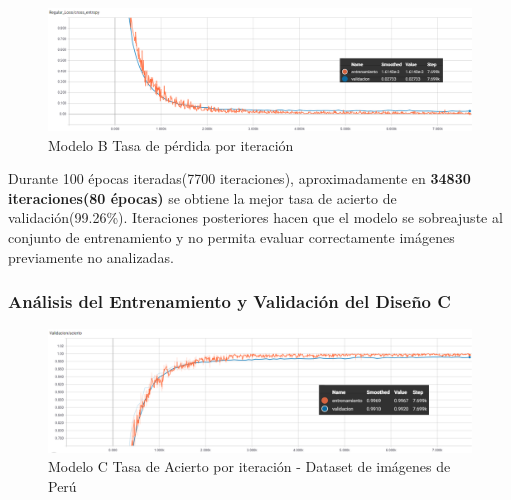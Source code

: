			
			\begin{figure}[H]
				\begin{center}
				\includegraphics[width=1\textwidth]{images/desarrollo/trainResults/peru/model1Loss} 
				\end{center}
				\begin{center}
				\caption{\small{Modelo B Tasa de pérdida por iteración}}
				
				{\small{\fontsize{10}{16.8}\selectfont {Fuente: Elaboración propia}}}
				\end{center}
				\vspace{-1.5em}
			\end{figure}

			Durante 100 épocas iteradas(7700 iteraciones), aproximadamente en  \textbf{34830 iteraciones(80 épocas)} se obtiene la mejor tasa de acierto de validación(99.26\%). Iteraciones posteriores hacen que el modelo se sobreajuste al conjunto de entrenamiento y no permita evaluar correctamente imágenes previamente no analizadas.



		\subsubsection{Análisis del Entrenamiento y Validación del Diseño C} 

			\begin{figure}[H]
				\begin{center}
				\includegraphics[width=1\textwidth]{images/desarrollo/trainResults/peru/model4Acierto} 
				\end{center}
				\begin{center}
				\caption{\small{Modelo C Tasa de Acierto por iteración - Dataset de imágenes de Perú  }}
				
				{\small{\fontsize{10}{16.8}\selectfont {Fuente: Elaboración propia}}}
				\end{center}
				\vspace{-1.5em}
			\end{figure}
			
